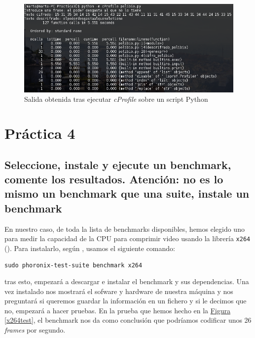 \documentclass[10pt,a4paper,spanish]{article}
\numberwithin{equation}{section} %
\numberwithin{figure}{section} %
\numberwithin{table}{section} %
\begin{document}
\begin{figure}[!h]
    \centering
    \includegraphics[width=1\textwidth]{3_42}
    \caption{Salida obtenida tras ejecutar \textit{cProfile} sobre un script Python}
    \label{outputprofile}
\end{figure}

\section{Práctica 4}
\subsection{Seleccione, instale y ejecute un benchmark, comente los resultados. \textbf{Atención}: no es lo mismo un benchmark que una suite, instale un benchmark}
En nuestro caso, de toda la lista de benchmarks disponibles, hemos elegido uno para medir la capacidad de la CPU para comprimir video usando la librería \texttt{x264} (\cite{x264}). Para instalarlo, según \cite{phoronixubuntu}, usamos el siguiente comando:
\begin{verbatim}
sudo phoronix-test-suite benchmark x264
\end{verbatim}

tras esto, empezará a descargar e instalar el benchmark y sus dependencias. Una vez instalado nos mostrará el sofware y hardware de nuestra máquina y nos preguntará si queremos guardar la información en un fichero y si le decimos que no, empezará a hacer pruebas. En la prueba que hemos hecho en la \hyperref[x264test]{Figura \ref*{x264test}}, el benchmark nos da como conclusión que podríamos codificar unos 26 \textit{frames} por segundo. 
\end{document}
